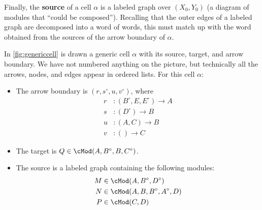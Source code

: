 \documentclass{amsart}
\renewcommand{\o}{^{\circ}}
\begin{document}
Finally, the \textbf{source} of a cell $\alpha$ is a labeled graph over $(X_0,Y_0)$ (a diagram of modules that ``could be composed'').
Recalling that the outer edges of a labeled graph are decomposed into a word of words, this must match up with the word obtained from the sources of the arrow boundary of $\alpha$.

In \cref{fig:genericcell} is drawn a generic cell $\alpha$ with its source, target, and arrow boundary.
We have not numbered anything on the picture, but technically all the arrows, nodes, and edges appear in ordered lists.
For this cell $\alpha$:
\begin{itemize}
\item The arrow boundary is $(r,s\o,u,v\o)$, where
  \begin{align*}
    r &: (B\o,E,E\o) \to A\\
    s &: (D\o) \to B\\
    u &: (A,C) \to B\\
    v &: () \to C
  \end{align*}
\item The target is $Q\in\cMod(A,B\o,B,C\o)$.
\item The source is a labeled graph containing the following modules:
  \begin{align*}
    M &\in \cMod(A,B\o,D\o)\\
    N &\in \cMod(A,B,B\o,A\o,D)\\
    P &\in \cMod(C,D)
  \end{align*}
\end{itemize}
\end{document}
